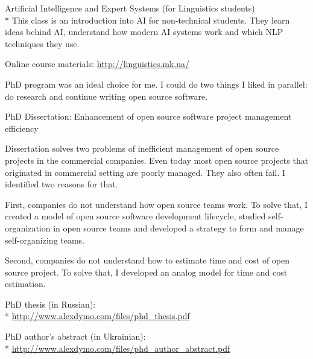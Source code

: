 \documentclass[12pt]{letter}
\begin{document}
\begin{llist}
            \item Artificial Intelligence and Expert Systems (for Linguistics students)\\*
            This class is an introduction into AI for non-technical students. They learn ideas behind AI, understand how modern AI systems work and which NLP techniques they use.

            \item Online course materials: \url{http://linguistics.mk.ua/}

  \endexperience




  \startexperience

            \item PhD program was an ideal choice for me. I could do two things I liked in parallel: do research and continue writing open source software.

            \item PhD Dissertation: Enhancement of open source software project management efficiency

            \item Dissertation solves two problems of inefficient management of open source projects in the commercial companies. Even today most open source projects that originated in commercial setting are poorly managed. They also often fail. I identified two reasons for that.

            \item First, companies do not understand how open source teams work. To solve that, I created a model of open source software development lifecycle, studied self-organization in open source teams and developed a strategy to form and manage self-organizing teams.

            \item Second, companies do not understand how to estimate time and cost of open source project. To solve that, I developed an analog model for time and cost estimation.

            \item PhD thesis (in Russian):\\*
            \url{http://www.alexdymo.com/files/phd_thesis.pdf}
            \item PhD author's abstract (in Ukrainian):\\* \url{http://www.alexdymo.com/files/phd_author_abstract.pdf}


\end{llist}
\end{document}

